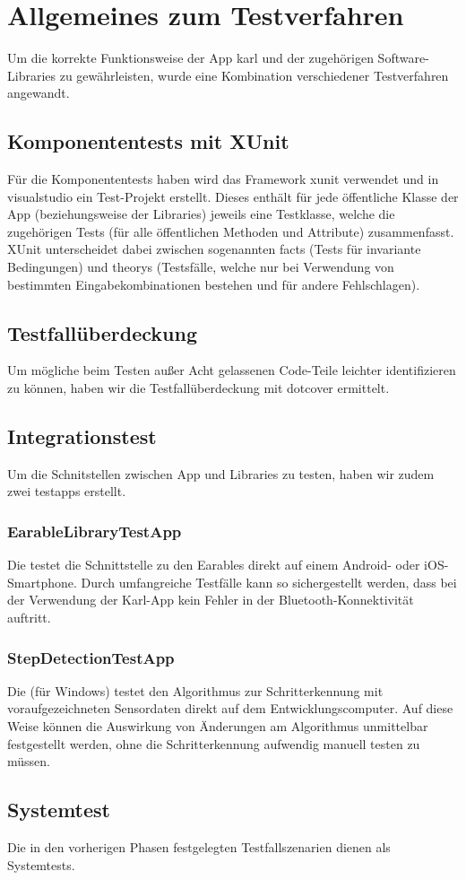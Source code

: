 \documentclass[../validierung.tex]{subfiles}
\begin{document}
\clearpage

\section{Allgemeines zum Testverfahren}
Um die korrekte Funktionsweise der App \Gls{karl} und der zugehörigen Software-Libraries zu gewährleisten,
wurde eine Kombination verschiedener Testverfahren angewandt.

\subsection{Komponententests mit XUnit}
Für die Komponententests haben wird das Framework \Gls{xunit} verwendet und in \gls{visualstudio} ein Test-Projekt erstellt.
Dieses enthält für jede öffentliche Klasse der App (beziehungsweise der Libraries) jeweils eine Testklasse, welche die zugehörigen Tests (für alle öffentlichen Methoden und Attribute) zusammenfasst.
XUnit unterscheidet dabei zwischen sogenannten \Gls{fact}s (Tests für invariante Bedingungen) und \Glspl{theory} (Testsfälle, welche nur bei Verwendung von bestimmten Eingabekombinationen bestehen und für andere Fehlschlagen).

\subsection{Testfallüberdeckung}
Um mögliche beim Testen außer Acht gelassenen Code-Teile leichter identifizieren zu können, haben wir die Testfallüberdeckung mit \gls{dotcover} ermittelt.

\subsection{Integrationstest}
Um die Schnitstellen zwischen App und Libraries zu testen, haben wir zudem zwei \Gls{testapp}s erstellt.

\subsubsection{EarableLibraryTestApp}
Die  testet die Schnittstelle zu den Earables direkt auf einem Android- oder iOS-Smartphone.
Durch umfangreiche Testfälle kann so sichergestellt werden, dass bei der Verwendung der Karl-App kein Fehler in der Bluetooth-Konnektivität auftritt.

\subsubsection{StepDetectionTestApp}
Die  (für Windows) testet den Algorithmus zur Schritterkennung mit voraufgezeichneten Sensordaten direkt auf dem Entwicklungscomputer.
Auf diese Weise können die Auswirkung von Änderungen am Algorithmus unmittelbar festgestellt werden, ohne die Schritterkennung aufwendig manuell testen zu müssen.

\subsection{Systemtest}
Die in den vorherigen Phasen festgelegten Testfallszenarien dienen als Systemtests.
\end{document}
